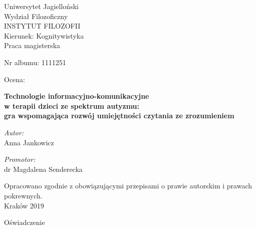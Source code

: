 \documentclass[a4paper,12pt]{report}
\title{\titlepl}
\author{\authorname}
\date{2019}
\newcommand{\authorname}{Anna Jankowicz}
\newcommand{\supname}{dr Magdalena Senderecka}
\newcommand{\titlepl}{Technologie informacyjno-komunikacyjne\\w terapii dzieci ze spektrum autyzmu:\\gra wspomagająca rozwój umiejętności czytania ze zrozumieniem}
\begin{document}

\thispagestyle{empty}

\vspace*{1cm}
{\centering\linespread{1.5}
    {\Large Uniwersytet Jagielloński\\Wydział Filozoficzny\\
        \uppercase{Instytut Filozofii}\\}
    {\large Kierunek: Kognitywistyka\\Praca magisterska\\}
}

\vspace{1cm}
\begin{minipage}[t]{0.4\textwidth}
    \begin{flushleft} \large Nr albumu: 1111251\\ \end{flushleft}
\end{minipage}
\begin{minipage}[t]{0.4\textwidth}
    \begin{flushright} \large Ocena:\\ \end{flushright}
\end{minipage}
\vspace{1cm}

{\centering\linespread{1.5}\LARGE\textbf{\titlepl\\}}

\vspace{2cm}
\begin{minipage}[t]{0.4\textwidth}
    \begin{flushleft} \large
    \emph{Autor:}\\ \authorname
    \end{flushleft}
\end{minipage}
\begin{minipage}[t]{0.5\textwidth}
    \begin{flushright} \large
    \emph{Promotor:}\\ \supname
    \end{flushright}
\end{minipage}
\vspace{1.5cm}

{\centering Opracowano zgodnie z obowiązującymi przepisami o prawie autorskim i prawach pokrewnych.\\ \vspace{0.7cm}\large{Kraków 2019\\}}


\newpage
\setcounter{page}{1}
\thispagestyle{firststyle}
Oświadczenie




\tableofcontents
\thispagestyle{firststyle}







\printbibliography[heading=bibintoc]
\end{document}
